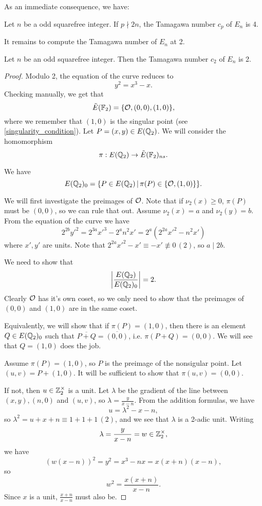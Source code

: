 \documentclass[12pt, a4paper]{amsart}
\begin{document}
As an immediate consequence, we have: 

\begin{thm}
  Let $n$ be a odd squarefree integer.
  If $p \nmid 2n $, the Tamagawa number $c_p$ of $E_n$ is 4.
\end{thm}

It remains to compute the Tamagawa number of $E_n$ at 2.

\begin{thm}
  Let $n$ be an odd squarefree integer. Then the Tamagawa number $c_2$
  of $E_n$ is 2.
\end{thm}

\begin{proof}
  Modulo 2, the equation of the curve reduces to
  \[y^2 = x^3 - x.\]
  Checking manually, we get that 
  \[\tilde{E}(\mathbb{F}_2) = \{{\mathcal O}, (0,0), (1,0)\},\]
  where we remember that $(1,0)$ is the singular point
  (see \autoref{singularity_condition}).
  Let $P = (x,y) \in E({\mathbb Q}_2)$. We will consider the homomorphism
  \[\pi: E({\mathbb Q}_2) \rightarrow \tilde{E}(\mathbb{F}_2)_{ns}.\]

  We have
  \[E({\mathbb Q}_2)_0 = \{P \in E({\mathbb Q}_2) \, | \, \pi(P) \in \{ {\mathcal O}, (1,0)\}\}.\]

  We will first investigate the preimages of ${\mathcal O}$. Note that if $\nu_2(x) \geq
  0$, $\pi(P)$ must be $(0,0)$, so we can rule that out. 
  Assume $\nu_2(x) = a$ and $\nu_2(y) = b$. From the equation of the curve we
  have
  \[2^{2b}y'^2 = 2^{3a}x'^3 - 2^an^2 x' = 2^a(2^{2a}x'^2 - n^2x')\]
  where $x', y'$ are units. Note that $2^{2a}x'^2 - x' \equiv -x' \not\equiv 0
  \, (2)$, so $a \mid 2b$.
  
  We need to show that
  \[\left| \frac{E({\mathbb Q}_2)}{E({\mathbb Q}_2)_0} \right| = 2.\]
  Clearly ${\mathcal O}$ has it's own coset, so we only need to show that the preimages
  of $(0,0)$ and $(1,0)$ are in the same coset.
  
  Equivalently, we will show that if $\pi(P) = (1,0)$, then there is an
  element $Q \in E({\mathbb Q}_2)_0$ such that $\overline{P+Q} = \overline{(0,0)}$,
  i.e. $\pi(P+Q) = (0,0)$. We will see that $Q = (1,0)$ does the job.
  
  Assume $\pi(P) = (1,0)$, so $P$ is the preimage of the nonsigular point.
  Let $(u,v) = P + (1,0)$. It will be sufficient to show that $\pi(u,v) = (0,0)$.

  If not, then $u \in {\mathbb Z}_2^{\times}$ is a unit. Let $\lambda$ be the gradient of the
  line between $(x,y), (n,0)$ and $(u,v)$, so $\lambda = \frac{y}{x-n}$.
  From the addition formulas, we have
  \[u = \lambda^2 - x - n,\]
  so $\lambda^2 = u + x + n \equiv 1 + 1 + 1\, (2)$, and we see that $\lambda$
  is a 2-adic unit. Writing
  \[\lambda = \frac{y}{x-n} = w \in {\mathbb Z}_2^{\times},\]
  we have
  \[(w(x-n))^2 = y^2 = x^3 -nx = x(x+n)(x-n),\]
  so
  \[w^2 = \frac{x(x+n)}{x-n}.\]
  Since $x$ is a unit, $\frac{x+n}{x-n}$ must also be.


\end{proof}
\end{document}
